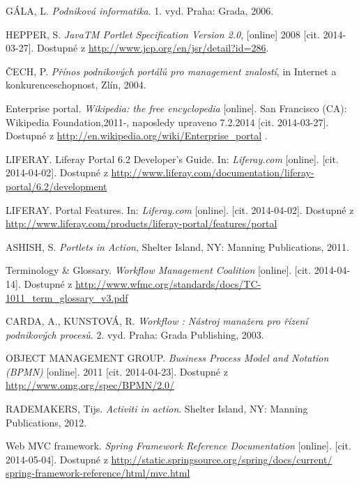 \documentclass{fithesis}
\begin{document}
\begin{thebibliography}{0}


GÁLA, L. \textit{Podniková informatika}. 1. vyd. Praha: Grada, 2006. 

HEPPER, S. \textit{JavaTM Portlet Specification Version 2.0}, [online] 2008 [cit. 2014-03-27]. Dostupné z \url{http://www.jcp.org/en/jsr/detail?id=286}.

ČECH, P. \textit {Přínos podnikových portálů pro management znalostí}, in Internet a konkurenceschopnost, Zlín, 2004.

Enterprise portal. \textit{Wikipedia: the free encyclopedia} [online]. San Francisco (CA): Wikipedia Foundation,2011-, naposledy upraveno 7.2.2014 [cit. 2014-03-27]. Dostupné z \url{http://en.wikipedia.org/wiki/Enterprise_portal} .

LIFERAY. Liferay Portal 6.2 Developer's Guide. In: \textit{Liferay.com} [online].  [cit. 2014-04-02]. Dostupné z \url{http://www.liferay.com/documentation/liferay-portal/6.2/development}

LIFERAY. Portal Features. In: \textit{Liferay.com} [online]. [cit. 2014-04-02]. Dostupné z \url{http://www.liferay.com/products/liferay-portal/features/portal}

ASHISH, S. \textit{Portlets in Action}, Shelter Island, NY: Manning Publications, 2011.

Terminology \& Glossary. \textit{Workflow Management Coalition} [online]. [cit. 2014-04-14]. Dostupné z \url{http://www.wfmc.org/standards/docs/TC-1011_term_glossary_v3.pdf} 

CARDA, A., KUNSTOVÁ, R. \textit {Workflow : Nástroj manažera pro řízení podnikových procesů}. 2. vyd. Praha: Grada Publishing, 2003.

OBJECT MANAGEMENT GROUP. \textit{Business Process Model and Notation (BPMN)} [online]. 2011 [cit. 2014-04-23]. Dostupné z \url{http://www.omg.org/spec/BPMN/2.0/} 

RADEMAKERS, Tijs. \textit{Activiti in action}. Shelter Island, NY: Manning Publications, 2012.

Web MVC framework. \textit{Spring Framework Reference Documentation} [online]. [cit. 2014-05-04]. Dostupné z \url{http://static.springsource.org/spring/docs/current/
spring-framework-reference/html/mvc.html} 


\end{thebibliography}
\end{document}
